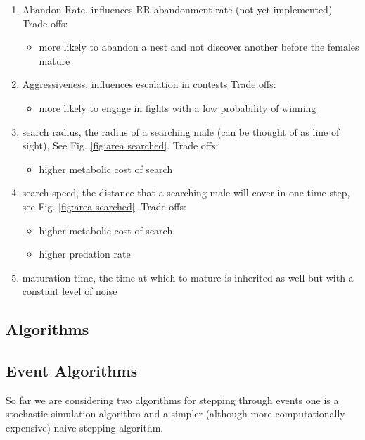 \documentclass[a4paper,11pt]{article}
\begin{document}
\begin{enumerate}
    \item Abandon Rate, influences RR abandonment rate (not yet implemented)
    Trade offs:
    \begin{itemize}
        \item more likely to abandon a nest and not discover another before the females mature
    \end{itemize}

    \item Aggressiveness, influences escalation in contests
    Trade offs:
    \begin{itemize}
        \item more likely to engage in fights with a low probability of winning
    \end{itemize}
    
    \item search radius, the radius of a searching male (can be thought of as line of sight), See Fig. \ref{fig:area searched}.
    Trade offs:
    \begin{itemize}
        \item higher metabolic cost of search
    \end{itemize}

    \item search speed, the distance that a searching male will cover in one time step, see Fig. \ref{fig:area searched}.
    Trade offs:
        \begin{itemize}
            \item higher metabolic cost of search
            \item higher predation rate
        \end{itemize}
    \item maturation time, the time at which to mature is inherited as well but with a constant level of noise
\end{enumerate}

\subsection{Algorithms}
\subsection{Event Algorithms}
So far we are considering two algorithms for stepping through events one is a stochastic simulation algorithm and a simpler (although more computationally expensive) naive stepping algorithm.
\end{document}
